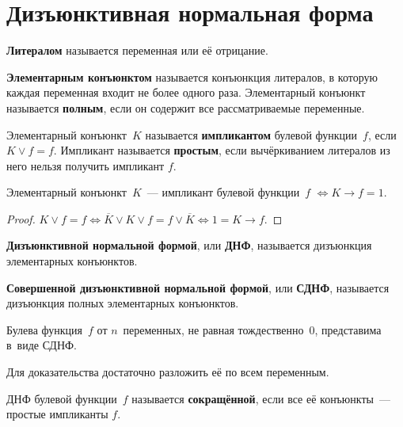 \section{Дизъюнктивная нормальная форма}
 \textbf{Литералом} называется переменная или её отрицание.

 \textbf{Элементарным конъюнктом} называется конъюнкция литералов, в которую каждая переменная входит не более одного раза.
Элементарный конъюнкт называется \textbf{полным}, если он содержит все рассматриваемые переменные.

 Элементарный конъюнкт~$K$ называется \textbf{импликантом} булевой функции~$f$, если $K \lor f = f$.
Импликант называется \textbf{простым}, если вычёркиванием литералов из него нельзя получить импликант $f$.

\begin{statement}
Элементарный конъюнкт~$K$~--- импликант булевой функции~$f$ $\Leftrightarrow K \rightarrow f = 1$.
\end{statement}
\begin{proof}
$K \lor f = f \Leftrightarrow
\overline K \lor K \lor f = f \lor \overline K \Leftrightarrow
1 = K \rightarrow f$.
\end{proof}

\textbf{Дизъюнктивной нормальной формой}, или \textbf{ДНФ}, называется дизъюнкция элементарных конъюнктов.

\textbf{Совершенной дизъюнктивной нормальной формой}, или \textbf{СДНФ}, называется дизъюнкция полных элементарных конъюнктов.

\begin{statement}
Булева функция~$f$ от $n$~переменных, не равная тождественно~$0$, представима в~виде СДНФ.
\end{statement}%
Для доказательства достаточно разложить её по всем переменным.

ДНФ булевой функции~$f$ называется \textbf{сокращённой}, если все её конъюнкты~--- простые импликанты $f$.

